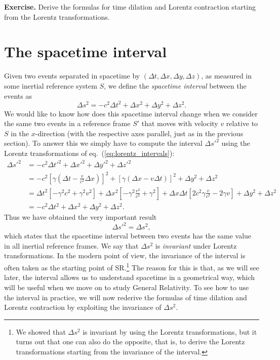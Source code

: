 \par\vspace{\baselineskip}

{\bf Exercise.} Derive the formulas for time dilation and Lorentz contraction starting from the Lorentz transformations.

\section{The spacetime interval}

Given two events separated in spacetime by $(\Delta t,\Delta x,\Delta y,\Delta z)$, as measured in some inertial reference system $S$, we define the {\it spacetime interval} between the events as
\begin{equation}
\Delta s^2=-c^2\Delta t^2+\Delta x^2+\Delta y^2+\Delta z^2.
\end{equation}
We would like to know how does this spacetime interval change when we consider the same two events in a reference frame $S'$ that moves with velocity $v$ relative to $S$ in the $x$-direction (with the respective axes parallel, just as in the previous section). To answer this we simply have to compute the interval $\Delta s'^2$ using the Lorentz transformations of eq.\ (\ref{eq:lorentz_intervals}):
\begin{equation}
\begin{split}
\Delta s'^2&=-c^2\Delta t'^2+\Delta x'^2+\Delta y'^2+\Delta z'^2\\
&=-c^2\left[\gamma\left(\Delta t-\frac{v}{c^2}\Delta x\right)\right]^2+\left[\gamma\left(\Delta x-v\Delta t\right)\right]^2+\Delta y^2+\Delta z^2\\
&=\Delta t^2\left[-\gamma^2c^2+\gamma^2v^2\right]+\Delta x^2\left[-\gamma^2\frac{v^2}{c^2}+\gamma^2\right]+\Delta x\Delta t\left[2c^2\gamma\frac{v}{c^2}-2\gamma v\right]+\Delta y^2+\Delta z^2\\
&=-c^2\Delta t^2+\Delta x^2+\Delta y^2+\Delta z^2.
\end{split}
\end{equation}
Thus we have obtained the very important result
\begin{equation}
\Delta s'^2=\Delta s^2,
\end{equation}
which states that the spacetime interval between two events has the same value in all inertial reference frames. We say that $\Delta s^2$ is {\it invariant} under Lorentz transformations. In the modern point of view, the invariance of the interval is often taken as the starting point of SR.\footnote{We showed that $\Delta s^2$ is invariant by using the Lorentz transformations, but it turns out that one can also do the opposite, that is, to derive the Lorentz transformations starting from the invariance of the interval.} The reason for this is that, as we will see later, the interval allows us to understand spacetime in a geometrical way, which will be useful when we move on to study General Relativity. To see how to use the interval in practice, we will now rederive the formulas of time dilation and Lorentz contraction by exploiting the invariance of $\Delta s^2$.

